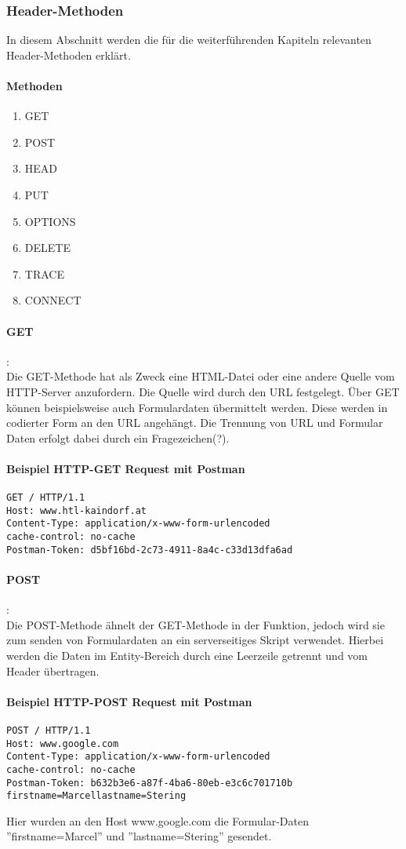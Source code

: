 \subsubsection{Header-Methoden}
In diesem Abschnitt werden die für die weiterführenden Kapiteln relevanten Header-Methoden erklärt.
\paragraph{Methoden}
\begin{enumerate}
\item GET
\item POST
\item HEAD
\item PUT
\item OPTIONS
\item DELETE
\item TRACE
\item CONNECT
\end{enumerate}
\paragraph{GET}:\\Die GET-Methode hat als Zweck eine HTML-Datei oder eine andere Quelle vom HTTP-Server anzufordern. Die Quelle wird durch den URL festgelegt. Über GET können beispielsweise auch Formulardaten übermittelt werden. Diese werden in codierter Form an den URL angehängt. Die Trennung von URL und Formular Daten erfolgt dabei durch ein Fragezeichen(?).
\paragraph{Beispiel HTTP-GET Request mit Postman}
\begin{lstlisting}
GET / HTTP/1.1
Host: www.htl-kaindorf.at
Content-Type: application/x-www-form-urlencoded
cache-control: no-cache
Postman-Token: d5bf16bd-2c73-4911-8a4c-c33d13dfa6ad
\end{lstlisting}
\paragraph{POST}:\\Die POST-Methode ähnelt der GET-Methode in der Funktion, jedoch wird sie zum senden von Formulardaten an ein serverseitiges Skript verwendet. Hierbei werden die Daten im Entity-Bereich durch eine Leerzeile getrennt und vom Header übertragen.
\paragraph{Beispiel HTTP-POST Request mit Postman}
\begin{lstlisting}
POST / HTTP/1.1
Host: www.google.com
Content-Type: application/x-www-form-urlencoded
cache-control: no-cache
Postman-Token: b632b3e6-a87f-4ba6-80eb-e3c6c701710b
firstname=Marcellastname=Stering
\end{lstlisting}
Hier wurden an den Host www.google.com die Formular-Daten ''firstname=Marcel'' und ''lastname=Stering'' gesendet.
